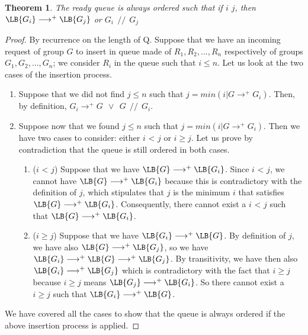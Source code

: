 \documentclass[11pt]{report}
\begin{document}
\newtheorem{insertion}{Theorem}
\begin{insertion}
The ready queue is always ordered such that if $i$ \le $j$, then $\LB{G_i}\longrightarrow^{+}\LB{G_j}$ or $G_i~\ //~\ G_j$
\end{insertion}
\begin{proof}
By recurrence on the length of Q.
Suppose that we have an incoming request of group $G$ to insert in queue made of $R_1,R_2,...,R_n$ respectively of groups $G_1,G_2,...,G_n$; we consider $R_i$ in the queue such that $i \le n$. Let us look at the two cases of the insertion process.
\begin{enumerate}
\item Suppose that we did not find $j \le n$ such that $j=min({i|G\longrightarrow^{+}G_i})$. Then, by definition, $G_i\longrightarrow^{+}G~\ \vee~\ G~\ //~\ G_i$.
\item Suppose now that we found $j \le n$ such that $j=min({i|G\longrightarrow^{+}G_i})$. Then we have two cases to consider: either $i$ < $j$ or $i \ge j$. Let us prove by contradiction that the queue is still ordered in both cases.
	\begin{enumerate}
		\item ($i$ < $j$) Suppose that we have $\LB{G}\longrightarrow^{+}\LB{G_i}$. Since $i$ < $j$, we cannot have $\LB{G}\longrightarrow^{+}\LB{G_i}$ because this is contradictory with the definition of $j$, which stipulates that $j$ is the minimum $i$ that satisfies $\LB{G}\longrightarrow^{+}\LB{G_i}$. Consequently, there cannot exist a $i$ < $j$ such that $\LB{G}\longrightarrow^{+}\LB{G_i}$.
		\item ($i \ge j$) Suppose that we have $\LB{G_i}\longrightarrow^{+}\LB{G}$. By definition of $j$, we have also $\LB{G}\longrightarrow^{+}\LB{G_j}$, so we have $\LB{G_i}\longrightarrow^{+}\LB{G}\longrightarrow^{+}\LB{G_j}$. By transitivity, we have then also $\LB{G_i}\longrightarrow^{+}\LB{G_j}$ which is contradictory with the fact that $i \ge j$ because $i \ge j$ means $\LB{G_j}\longrightarrow^{+}\LB{G_i}$. So there cannot exist a $i \ge j$ such that $\LB{G_i}\longrightarrow^{+}\LB{G}$.
	\end{enumerate}
\end{enumerate}
We have covered all the cases to show that the queue is always ordered if the above insertion process is applied.


\end{proof}
\end{document}
